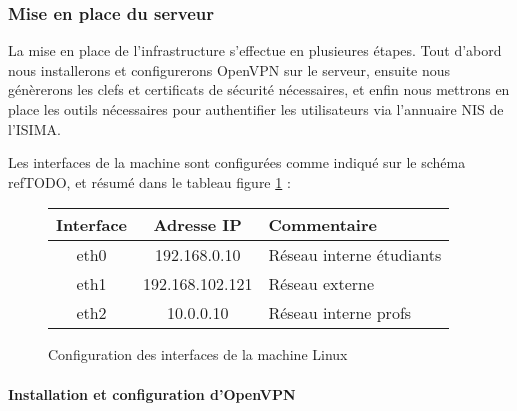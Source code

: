% 

\subsubsection{Mise en place du serveur}

La mise en place de l'infrastructure s'effectue en plusieures étapes. Tout d'abord nous installerons et configurerons OpenVPN sur le serveur, ensuite nous génèrerons les clefs et certificats de sécurité nécessaires, et enfin nous mettrons en place les outils nécessaires pour authentifier les utilisateurs via l'annuaire NIS de l'ISIMA.

Les interfaces de la machine sont configurées comme indiqué sur le schéma ref{TODO}, et résumé dans le tableau figure \ref{linux_interfaces} :

\begin{figure}[H]
	\begin{center}
		\begin{tabular}{c|c|l}
			Interface & Adresse IP & Commentaire \\
			\hline
			eth0 & 192.168.0.10 & Réseau interne étudiants \\
			eth1 & 192.168.102.121 & Réseau externe \\
			eth2 & 10.0.0.10 & Réseau interne profs \\
		\end{tabular}
	\end{center}
	\caption{Configuration des interfaces de la machine Linux}
	\label{linux_interfaces}
\end{figure}


\paragraph{Installation et configuration d'OpenVPN}

